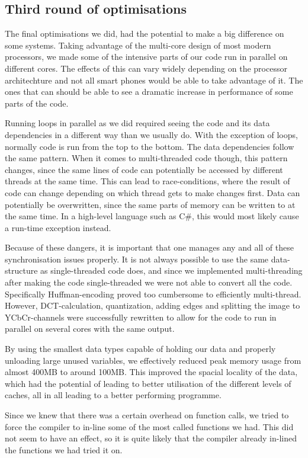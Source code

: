 \subsection{Third round of optimisations}
The final optimisations we did, had the potential to make a big difference on some systems.
Taking advantage of the multi-core design of most modern processors, we made some of the intensive parts of our code run in parallel on different cores.
The effects of this can vary widely depending on the processor architechture and not all smart phones would be able to take advantage of it.
The ones that can should be able to see a dramatic increase in performance of some parts of the code.

Running loops in parallel as we did required seeing the code and its data dependencies in a different way than we usually do.
With the exception of loops, normally code is run from the top to the bottom.
The data dependencies follow the same pattern.
When it comes to multi-threaded code though, this pattern changes, since the same lines of code can potentially be accessed by different threads at the same time.
This can lead to race-conditions, where the result of code can change depending on which thread gets to make changes first.
Data can potentially be overwritten, since the same parts of memory can be written to at the same time.
In a high-level language such as C\#, this would most likely cause a run-time exception instead.

Because of these dangers, it is important that one manages any and all of these synchronisation issues properly.
It is not always possible to use the same data-structure as single-threaded code does, and since we implemented multi-threading after making the code single-threaded we were not able to convert all the code.
Specifically Huffman-encoding proved too cumbersome to efficiently multi-thread.
However, DCT-calculation, quantization, adding edges and splitting the image to YCbCr-channels were successfully rewritten to allow for the code to run in parallel on several cores with the same output.

By using the smallest data types capable of holding our data and properly unloading large unused variables, we effectively reduced peak memory usage from almost 400MB to around 100MB.
This improved the spacial locality of the data, which had the potential of leading to better utilisation of the different levels of caches, all in all leading to a better performing programme.

Since we knew that there was a certain overhead on function calls, we tried to force the compiler to in-line some of the most called functions we had. 
This did not seem to have an effect, so it is quite likely that the compiler already in-lined the functions we had tried it on.

